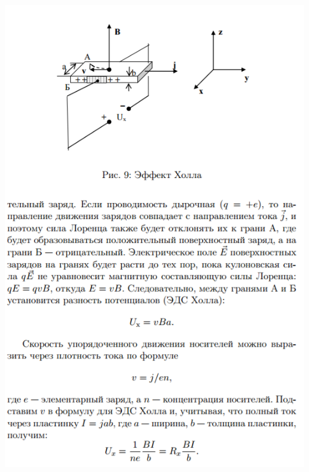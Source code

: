 \documentclass[12pt]{article}
\begin{document}
\begin{center}
	    \includegraphics[width=15cm]{theory13.png}

\end{center}
\end{document}
